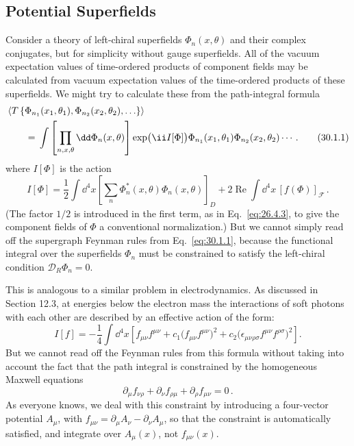 
\providecommand{\SuperD}{\mathcal{D}}

\subsection{Potential Superfields}

Consider a theory of left-chiral superfields \(\Phi_n(x,\theta)\) and their
complex conjugates, but for simplicity without gauge superfields. All of the
vacuum expectation values of time-ordered products of component fields may be
calculated from vacuum expectation values of the time-ordered products of
these superfields. We might try to calculate these from the path-integral
formula
\begin{align}
  &\left\langle
    T\left\{\Phi_{n_1}(x_1,\theta_1),
      \Phi_{n_2}(x_2,\theta_2),\ldots\right\}
   \right\rangle \notag\\
  &\qquad={}
  \int\left[\prod_{n,x,\theta}\dd\Phi_n(x,\theta)\right]
    \exp\bigl(\ii I[\Phi]\bigr)
    \Phi_{n_1}(x_1,\theta_1)\Phi_{n_2}(x_2,\theta_2)\cdots\,.
  \tag{30.1.1}\label{eq:30.1.1}
\end{align}
where \(I[\Phi]\) is the action
\begin{equation}
  I[\Phi]
  =\frac12\int \dd^4x
    \left[\sum_n\Phi_n^*(x,\theta)\Phi_n(x,\theta)\right]_D
   +2\operatorname{Re}\int \dd^4x\,[f(\Phi)]_{\mathcal{F}}\,.
  \tag{30.1.2}\label{eq:30.1.2}
\end{equation}
(The factor \(1/2\) is introduced in the first term, as in
Eq.~\eqref{eq:26.4.3}, to give the component fields of \(\Phi\) a conventional
normalization.) But we cannot simply read off the supergraph Feynman rules
from Eq.~\eqref{eq:30.1.1}, because the functional integral over the
superfields \(\Phi_n\) must be constrained to satisfy the left-chiral
condition \(\SuperD_R\Phi_n=0\).

This is analogous to a similar problem in electrodynamics. As discussed in
Section 12.3, at energies below the electron mass the interactions of soft
photons with each other are described by an effective action of the form:
\[
  I[f]
  =-\frac14\int \dd^4x\left[
    f_{\mu\nu}f^{\mu\nu}
    +c_1\bigl(f_{\mu\nu}f^{\mu\nu}\bigr)^2
    +c_2\bigl(\epsilon_{\mu\nu\rho\sigma}
       f^{\mu\nu}f^{\rho\sigma}\bigr)^2
  \right].
\]
But we cannot read off the Feynman rules from this formula without taking
into account the fact that the path integral is constrained by the
homogeneous Maxwell equations
\[
  \partial_\mu f_{\nu\rho}
  +\partial_\nu f_{\rho\mu}
  +\partial_\rho f_{\mu\nu}=0\,.
\]
As everyone knows, we deal with this constraint by introducing a four-vector
potential \(A_\mu\), with
\(f_{\mu\nu}=\partial_\mu A_\nu-\partial_\nu A_\mu\), so that the constraint
is automatically satisfied, and integrate over \(A_\mu(x)\), not
\(f_{\mu\nu}(x)\).

